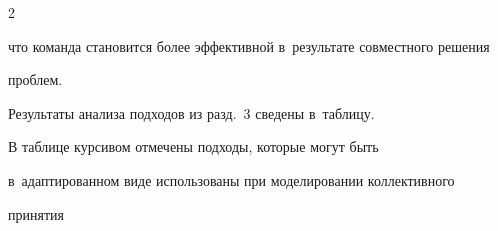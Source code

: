 \begin{multicols}{2}
\begin{enumerate}[(1)]
что команда становится более эффективной в~результате совместного решения 

проб\-лем. 

  \end{enumerate}

  

  Результаты анализа подходов из разд.~3 сведены в~таб\-лицу.

  

  

  В таблице курсивом отмечены подходы, которые могут быть 

в~адаптированном виде использованы при моделировании коллективного 

принятия\linebreak\vspace*{-12pt}



\pagebreak



\end{multicols}



